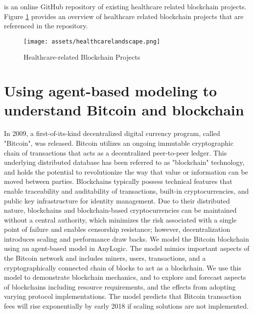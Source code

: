 \documentclass[12pt]{report}
\begin{document}
\cite{.healthhub} is an online GitHub repository of existing healthcare related blockchain projects. Figure \ref{fig:landscape2} provides an overview of healthcare related blockchain projects that are referenced in the repository.

\begin{figure}[h]
\texttt{[image: assets/healthcarelandscape.png]}
\caption{Healthcare-related Blockchain Projects \cite{.healthhub}}
\label{fig:landscape2}
\end{figure}

\chapter{Using agent-based modeling to understand Bitcoin and blockchain}
In 2009, a first-of-its-kind decentralized digital currency program, called "Bitcoin", was released. Bitcoin utilizes an ongoing immutable cryptographic chain of transactions that acts as a decentralized peer-to-peer ledger. This underlying distributed database has been referred to as "blockchain" technology, and holds the potential to revolutionize the way that value or information can be moved between parties.  Blockchains typically possess technical features that enable traceability and auditability of transactions, built-in cryptocurrencies, and public key infrastructure for identity management. Due to their distributed nature, blockchains and blockchain-based cryptocurrencies can be maintained without a central authority, which minimizes the risk associated with a single point of failure and enables censorship resistance; however, decentralization introduces scaling and performance draw backs.  We model the Bitcoin blockchain using an agent-based model in AnyLogic. The model mimics important aspects of the Bitcoin network and includes miners, users, transactions, and a cryptographically connected chain of blocks to act as a blockchain. We use this model to demonstrate blockchain mechanics, and to explore and forecast aspects of blockchains including resource requirements, and the effects from adopting varying protocol implementations. The model predicts that Bitcoin transaction fees will rise exponentially by early 2018 if scaling solutions are not implemented.
\end{document}
